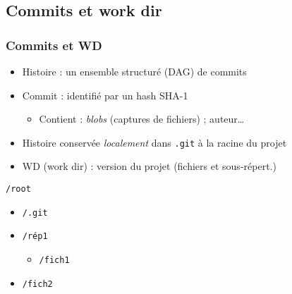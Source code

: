 \documentclass[english, french]{beamer}
\begin{document}
\subsection[Commits et work dir]{Commits et work dir}
\begin{frame}
	\frametitle{Commits et WD}
	\begin{itemize}
		\item Histoire : un ensemble structuré (DAG) de \og{}commits\fg{}
		\item Commit : identifié par un hash SHA-1
		\begin{itemize}
			\item Contient : \emph{blobs} (captures de fichiers) ; auteur…
		\end{itemize}
	\end{itemize}
	{
		\centering
		\par
	}
	\begin{itemize}
		\item Histoire conservée \emph{localement} dans \texttt{.git} à la racine du projet
		\item WD (\og{}work dir\fg{}) : version du projet (fichiers et sous-répert.)
	\end{itemize}
	\texttt{/root}
	\begin{itemize}
		\item[] \texttt{/.git}
		\item[] \texttt{/rép1}
		\begin{itemize}
			\item[] \texttt{/fich1}
		\end{itemize}
		\item[] \texttt{/fich2}
	\end{itemize}
\end{frame}
\end{document}
